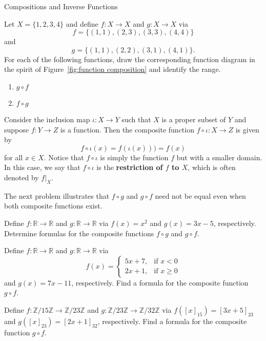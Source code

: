 \begin{section}{Compositions and Inverse Functions}
\begin{problem}
Let $X=\{1,2,3,4\}$ and define $f:X\to X$ and $g:X\to X$ via
\[
f=\{(1,1),(2,3),(3,3),(4,4)\}
\]
and
\[
g=\{(1,1),(2,2),(3,1),(4,1)\}.
\]
For each of the following functions, draw the corresponding function diagram in the spirit of Figure~\ref{fig:function composition} and identify the range.
\begin{enumerate}[label=\textrm{(\alph*)}]
\item $g\circ f$
\item $f\circ g$
\end{enumerate}
\end{problem}

\begin{example}
Consider the inclusion map $\iota:X\to Y$ such that $X$ is a proper subset of $Y$ and suppose $f:Y\to Z$ is a function. Then the composite function $f\circ \iota:X\to Z$ is given by
\[
f\circ \iota(x)=f(\iota(x)))=f(x)
\]
for all $x\in X$. Notice that $f\circ \iota$ is simply the function $f$ but with a smaller domain.  In this case, we say that $f\circ \iota$ is the \textbf{restriction of $f$ to $X$}, which is often denoted by $f|_X$.
\end{example}

The next problem illustrates that $f\circ g$ and $g\circ f$ need not be equal even when both composite functions exist.

\begin{problem}
Define $f:\mathbb{R}\to \mathbb{R}$ and $g:\mathbb{R}\to \mathbb{R}$ via $f(x)=x^2$ and $g(x)=3x-5$, respectively. Determine formulas for the composite functions $f\circ g$ and $g\circ f$.
\end{problem}

\begin{problem}
Define $f:\mathbb{R}\to \mathbb{R}$ and $g:\mathbb{R}\to \mathbb{R}$ via
\[
f(x)=\begin{cases}
5x+7, & \text{if }x< 0\\
2x+1, & \text{if }x\geq 0
\end{cases}
\]
and $g(x)=7x-11$, respectively. Find a formula for the composite function $g\circ f$.
\end{problem}

\begin{problem}
Define $f:\mathbb{Z}/15\mathbb{Z}\to \mathbb{Z}/23\mathbb{Z}$ and $g:\mathbb{Z}/23\mathbb{Z}\to \mathbb{Z}/32\mathbb{Z}$ via $f([x]_{15})=[3x+5]_{23}$ and $g([x]_{23})=[2x+1]_{32}$, respectively. Find a formula for the composite function $g\circ f$.
\end{problem}


\end{section}
